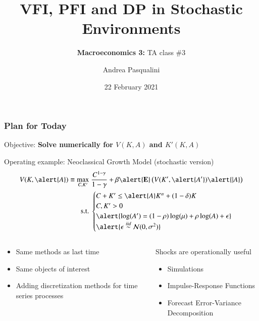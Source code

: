 \documentclass[10pt, aspectratio=1610, handout]{beamer}
\title[VFI, PFI and DP]{
  \textbf{VFI, PFI and DP in Stochastic Environments}
}
\subtitle[Macro 3: TA\#3]{
  \textbf{Macroeconomics 3:} TA class \#3
}
\author[A.~Pasqualini]{
  Andrea Pasqualini
}
\institute[Bocconi]{Bocconi University}
\date{
  22 February 2021
}
\newcommand{\E}{\mathbf{E}}
\begin{document}
  \begin{frame}
    \maketitle
  \end{frame}

  \begin{frame}
    \frametitle{Plan for Today}

    Objective: \textbf{Solve numerically for $V(K, A)$ and $K'(K, A)$}

    \vfill\pause

    Operating example: Neoclassical Growth Model (stochastic version)
    \begin{align*}
      V(K, \alert{A}) \equiv \max_{C, K'} &\; \frac{C^{1 - \gamma}}{1 - \gamma} + \beta \alert{\E} \left( V(K', \alert{A'}) \alert{| A} \right) \\
      \text{s.t.} &\;
      \begin{cases}
        C + K' \leq \alert{A} K^\alpha + (1 - \delta) K \\
        C, K' > 0 \\
        \alert{\log(A') = (1-\rho) \log(\mu) + \rho \log(A) + \epsilon} \\
        \alert{\epsilon \overset{iid}{\sim} \mathcal{N}(0, \sigma^2)}
      \end{cases}
    \end{align*}

    \vfill\pause

    \begin{columns}[T]
      \begin{column}{0.45\textwidth}
        \begin{itemize}
          \item Same methods as last time
          \item Same objects of interest
          \item Adding discretization methods for time series processes
        \end{itemize}
      \end{column}
      \begin{column}{0.45\textwidth}
        Shocks are operationally useful
        \begin{itemize}
          \item Simulations
          \item Impulse-Response Functions
          \item Forecast Error-Variance Decomposition
        \end{itemize}
      \end{column}
    \end{columns}

  \end{frame}
\end{document}
